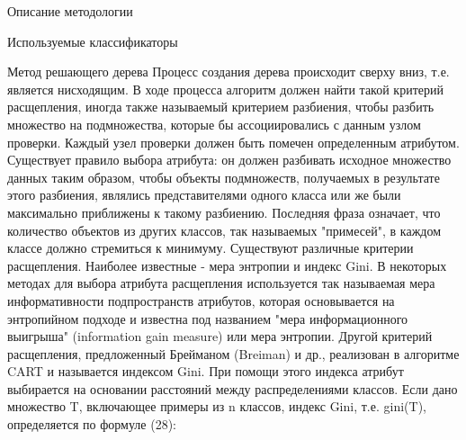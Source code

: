 \begin{section}{Описание методологии}
\begin{subsection}{Используемые классификаторы}
\begin{subsubsection}{Метод решающего дерева}
Процесс создания дерева происходит сверху вниз, т.е. является нисходящим. В ходе процесса алгоритм должен найти такой критерий расщепления, иногда также называемый критерием разбиения, чтобы разбить множество на подмножества, которые бы ассоциировались с данным узлом проверки. Каждый узел проверки должен быть помечен определенным атрибутом. Существует правило выбора атрибута: он должен разбивать исходное множество данных таким образом, чтобы объекты подмножеств, получаемых в результате этого разбиения, являлись представителями одного класса или же были максимально приближены к такому разбиению. Последняя фраза означает, что количество объектов из других классов, так называемых "примесей", в каждом классе должно стремиться к минимуму.
Существуют различные критерии расщепления. Наиболее известные - мера энтропии и индекс Gini.
В некоторых методах для выбора атрибута расщепления используется так называемая мера информативности подпространств атрибутов, которая основывается на энтропийном подходе и известна под названием "мера информационного выигрыша" (information gain measure) или мера энтропии.
Другой критерий расщепления, предложенный Брейманом (Breiman) и др., реализован в алгоритме CART и называется индексом Gini. При помощи этого индекса атрибут выбирается на основании расстояний между распределениями классов.
Если дано множество T, включающее примеры из n классов, индекс Gini, т.е. gini(T), определяется по формуле (28):


\end{subsubsection}
\end{subsection}
\end{section}
